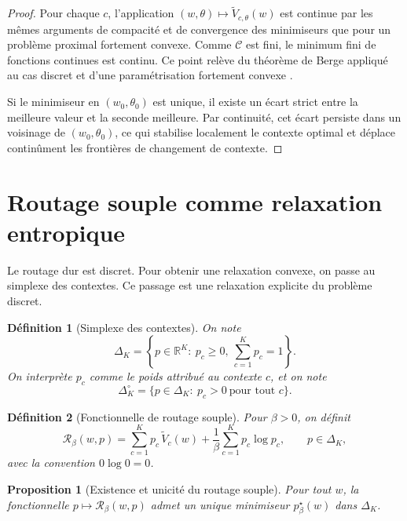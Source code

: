 \documentclass[11pt,a4paper]{article}
\newtheorem{definition}{Définition}[section]
\newtheorem{proposition}{Proposition}[section]
\newcommand{\R}{\mathbb R}
\newcommand{\Ccal}{\mathcal C}
\newcommand{\Rcal}{\mathcal R}
\begin{document}
\begin{proof}
Pour chaque \(c\), l'application \((w,\theta)\mapsto \widetilde V_{c,\theta}(w)\) est continue par les mêmes arguments de compacité et de convergence des minimiseurs que pour un problème proximal fortement convexe. Comme \(\Ccal\) est fini, le minimum fini de fonctions continues est continu. Ce point relève du théorème de Berge appliqué au cas discret et d'une paramétrisation fortement convexe \cite{RockafellarWets1998}.

Si le minimiseur en \((w_0,\theta_0)\) est unique, il existe un écart strict entre la meilleure valeur et la seconde meilleure. Par continuité, cet écart persiste dans un voisinage de \((w_0,\theta_0)\), ce qui stabilise localement le contexte optimal et déplace continûment les frontières de changement de contexte.
\end{proof}

\section{Routage souple comme relaxation entropique}

Le routage dur est discret. Pour obtenir une relaxation convexe, on passe au simplexe des contextes. Ce passage est une relaxation explicite du problème discret.

\begin{definition}[Simplexe des contextes]
On note
\[
\Delta_K
=
\left\{
p\in\R^K:\ p_c\ge 0,\ \sum_{c=1}^K p_c=1
\right\}.
\]
On interprète \(p_c\) comme le poids attribué au contexte \(c\), et on note
\[
\Delta_K^\circ
=
\{p\in\Delta_K:\ p_c>0\ \text{pour tout }c\}.
\]
\end{definition}

\begin{definition}[Fonctionnelle de routage souple]
Pour \(\beta>0\), on définit
\[
\Rcal_\beta(w,p)
=
\sum_{c=1}^K p_c\,\widetilde V_c(w)
+
\frac{1}{\beta}\sum_{c=1}^K p_c\log p_c,
\qquad p\in\Delta_K,
\]
avec la convention \(0\log 0=0\).
\end{definition}

\begin{proposition}[Existence et unicité du routage souple]
Pour tout \(w\), la fonctionnelle \(p\mapsto \Rcal_\beta(w,p)\) admet un unique minimiseur \(p^\star_\beta(w)\) dans \(\Delta_K\).
\end{proposition}
\end{document}
